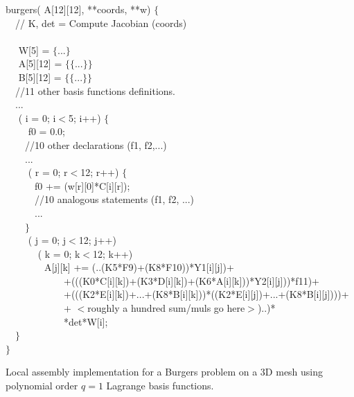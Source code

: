 \begin{algorithm}[t]
\scriptsize
{}

 burgers( A[12][12],  **coords,  **w) $\lbrace$\\
~~// K, det = Compute Jacobian (coords) \\
~~\\
~~ W[5] = $\lbrace$...$\rbrace$\\
~~ A[5][12] = $\lbrace\lbrace$...$\rbrace\rbrace$\\
~~ B[5][12] = $\lbrace\lbrace$...$\rbrace\rbrace$\\
~~//11 other basis functions definitions.\\
~~...\\
~~ ( i = 0; i$<$5; i++) $\lbrace$\\
~~~~ f0 = 0.0;\\
~~~~//10 other declarations (f1, f2,...)\\
~~~~...\\
~~~~ ( r = 0; r$<$12; r++) $\lbrace$\\
~~~~~~f0 += (w[r][0]*C[i][r]);\\
~~~~~~//10 analogous statements (f1, f2, ...)\\
~~~~~~...\\
~~~~$\rbrace$\\
~~~~ ( j = 0; j$<$12; j++) \\
~~~~~~ ( k = 0; k$<$12; k++) \\
~~~~~~~~A[j][k] += (..(K5*F9)+(K8*F10))*Y1[i][j])+\\
~~~~~~~~~~~~+(((K0*C[i][k])+(K3*D[i][k])+(K6*A[i][k]))*Y2[i][j]))*f11)+\\
~~~~~~~~~~~~+(((K2*E[i][k])+...+(K8*B[i][k]))*((K2*E[i][j])+...+(K8*B[i][j])))+\\
~~~~~~~~~~~~+ $<$roughly a hundred sum/muls go here$>$)..)*\\
~~~~~~~~~~~~*det*W[i];\\
~~$\rbrace$ \\
$\rbrace$
\caption{Local assembly implementation for a Burgers problem on a 3D mesh using polynomial order $q=1$ Lagrange basis functions.}
\label{code:burgers}
\end{algorithm}

